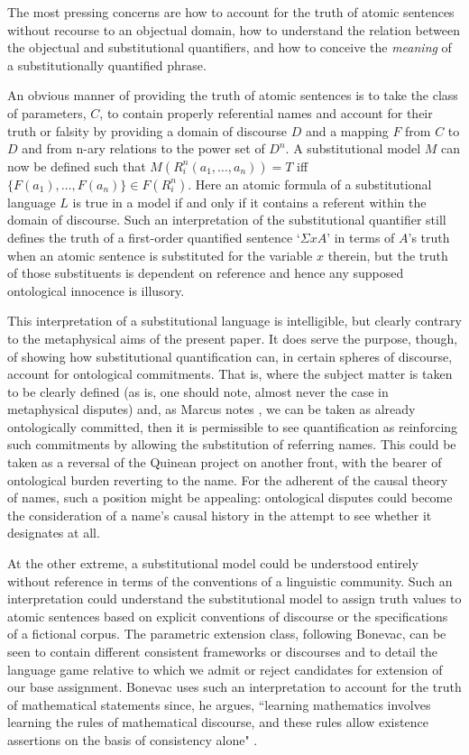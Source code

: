 The most pressing concerns are how to account for the truth of atomic
sentences without recourse to an objectual domain, how to understand
the relation between the objectual and substitutional quantifiers, and
how to conceive the \emph{meaning} of a substitutionally quantified
phrase.

An obvious manner of providing the truth of atomic sentences is to
take the class of parameters, $C$, to contain properly referential
names and account for their truth or falsity by providing a domain of
discourse $D$ and a mapping $F$ from $C$ to $D$ and from n-ary
relations to the power set of $D^n$. A substitutional model $M$ can
now be defined such that $M(R^n_i(a_1, \ldots, a_n)) = T$ iff $\{F(a_1),
\ldots, F(a_n)\} \in F(R^n_i)$.  Here an atomic formula of a
substitutional language $L$ is true in a model if and only if it
contains a referent within the domain of discourse.  Such an
interpretation of the substitutional quantifier still defines the
truth of a first-order quantified sentence `$\Sigma xA$' in terms of
$A$'s truth when an atomic sentence is substituted for the variable
$x$ therein, but the truth of those substituents is dependent on
reference and hence any supposed ontological innocence is illusory.

This interpretation of a substitutional language is intelligible, but
clearly contrary to the metaphysical aims of the present paper.  It
does serve the purpose, though, of showing how substitutional
quantification can, in certain spheres of discourse, account for
ontological commitments.  That is, where the subject matter is taken
to be clearly defined (as is, one should note, almost never the case
in metaphysical disputes) and, as Marcus notes \cite{marcus72}, we can
be taken as already ontologically committed, then it is permissible to
see quantification as reinforcing such commitments by allowing the
substitution of referring names. This could be taken as a reversal of
the Quinean project on another front, with the bearer of ontological
burden reverting to the name.  For the adherent of the causal theory
of names, such a position might be appealing: ontological disputes
could become the consideration of a name's causal history in the
attempt to see whether it designates at all.

At the other extreme, a substitutional model could be understood
entirely without reference in terms of the conventions of a linguistic
community.  Such an interpretation could understand the substitutional
model to assign truth values to atomic sentences based on explicit
conventions of discourse or the specifications of a fictional corpus.
The parametric extension class, following Bonevac, can be seen to
contain different consistent frameworks or discourses and to detail
the language game relative to which we admit or reject candidates for
extension of our base assignment.  Bonevac uses such an
interpretation to account for the truth of mathematical statements
since, he argues, ``learning mathematics involves learning the rules
of mathematical discourse, and these rules allow existence assertions
on the basis of consistency alone" \cite[p.650]{bonevac84}.

